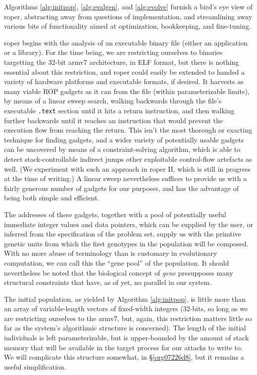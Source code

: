\documentclass[12pt,glossary]{dalthesis}
\begin{document}
Algorithms \ref{alg:initpop}, \ref{alg:evalgen}, and \ref{alg:evolve}
furnish a bird's eye view of \gls{roper}, abstracting away from questions of
implementation, and streamlining away various bits of functionality
aimed at optimization, bookkeeping, and fine-tuning.

\gls{roper} begins with the analysis of an executable binary file (either an
application or a library). For the time being, we are restricting
ourselves to binaries targetting the 32-bit \gls{armv7} architecture, in ELF
format, but there is nothing essential about this restriction, and
\gls{roper} could easily be extended to handed a variety of hardware
platforms and executable formats, if desired. It harvests as many viable
ROP gadgets as it can from the file (within parameterizable limits), by 
means of a linear sweep search, walking backwards through the file's
executable \texttt{.text} section until it hits a return instruction, and then
walking further backwards until it reaches an instruction that would
prevent the execution flow from reaching the return. This isn't the
most thorough or exacting technique for finding gadgets, and a wider
variety of potentially usable gadgets can be uncovered by means of
a constraint-solving algorithm, which is able to detect stack-controllable
indirect jumps other exploitable control-flow artefacts as well. (We experiment
with such an approach in \gls{roper} II, which is still in progress at the time of
writing.) A linear sweep nevertheless suffices to provide us with a fairly
generous number of gadgets for our purposes, and has the advantage of being
both simple and efficient.

The addresses of these gadgets, together with a pool of potentially useful
immediate integer values and data pointers, which can be supplied by the
user, or inferred from the specification of the problem set, supply us with
the primtive genetic units from which the first genotypes in the population will
be composed. With no more abuse of terminology than is customary in evolutionary
computation, we can call this the ``gene pool'' of the population. It should
nevertheless be noted that the biological concept of \emph{gene} presupposes many
structural constraints that have, as of yet, no parallel in our system.

The initial population, as yielded by Algorithm \ref{alg:initpop}, is
little more than an array of variable-length vectors of fixed-width
integers (32-bits, so long as we are restricting ourselves to the
\gls{armv7}, but, again, this restriction matters little so far as the
system's algorithmic structure is concerned). The length of the
initial individuals is left parameterizable, but is upper-bounded by
the amount of stack memory that will be available in the target
process for our attacks to write to. We will complicate this structure
somewhat, in \S \ref{org07226d8}, but it remains a useful
simplification.
\end{document}
